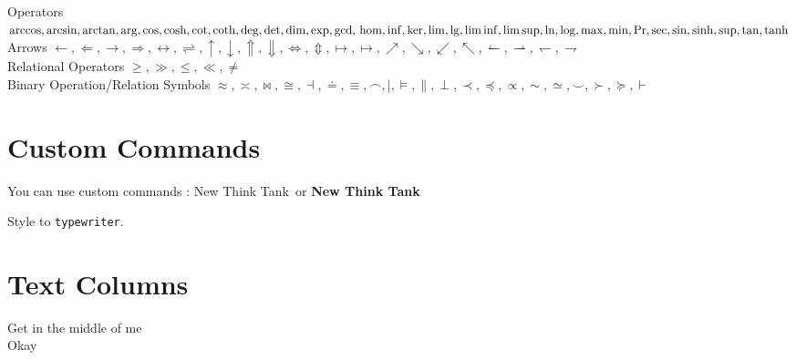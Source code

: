\documentclass[a4paper,12pt]{book}
\newcommand{\NTT}{New Think Tank}
\newcommand{\NTTB}{\textbf{New Think Tank}}
\newcommand{\typew}[1]{\texttt{#1}}
\begin{document}
Operators $\arccos, \arcsin, \arctan, \arg, \cos, \cosh, \cot, \coth, \deg, 
\det, \dim, \exp, \gcd,\\ \hom, \inf, \ker, \lim, \lg, \liminf, \limsup, \ln, \log, 
\max, \min, \Pr, \sec, \sin, \sinh, \sup, \tan, \tanh$ \\
 
Arrows $\leftarrow, \Leftarrow, \rightarrow, \Rightarrow, \leftrightarrow, \rightleftharpoons,
 \uparrow, \downarrow, \Uparrow, \Downarrow, \Leftrightarrow, \Updownarrow, \mapsto, \longmapsto, 
 \nearrow, \searrow, \swarrow, \nwarrow, \leftharpoonup, \rightharpoonup, \leftharpoondown, \rightharpoondown$ \\
 
 Relational Operators $ \geq, \gg, \leq, \ll, \neq $ \\
 
Binary Operation/Relation Symbols $ \approx, \asymp, \bowtie, \cong, \dashv, \doteq, 
\equiv, \frown, \mid, \models, \parallel, \perp, \prec, \preceq, \propto, \sim, \simeq, \smile, 
\succ, \succeq, \vdash $ \\
 
 
 
\section{\textsf{Custom Commands}}
 
You can use custom commands : \NTT\ or \NTTB\
 
Style to \typew{typewriter}.
 
 
\section{\textsf{Text Columns}}
 
 
{\centering
Get in the middle of me\\
Okay\\[10pt]
}
 
 
 
 
 
\end{document}
